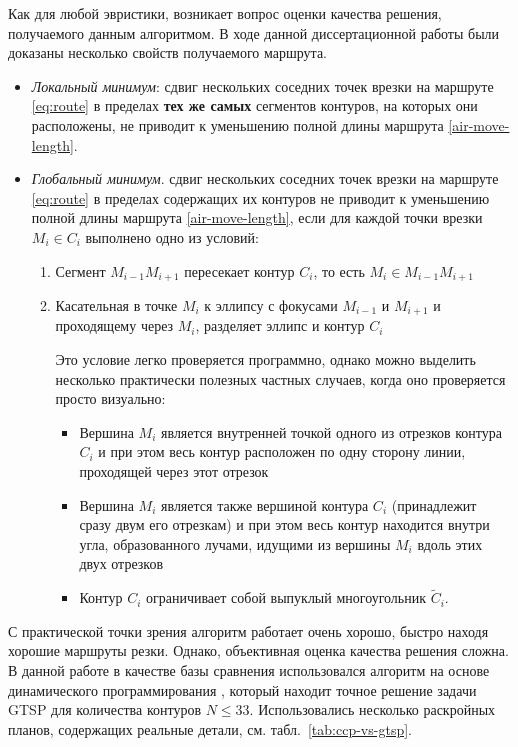 Как для любой эвристики,
возникает вопрос оценки качества решения,
получаемого данным алгоритмом.
В ходе данной диссертационной работы были доказаны несколько свойств получаемого маршрута.

\begin{itemize}
  \item
  {\it Локальный минимум}:
  сдвиг нескольких соседних точек врезки на маршруте \eqref{eq:route}
  в пределах {\bf тех же самых} сегментов контуров,
  на которых они расположены,
  не приводит к уменьшению полной длины маршрута \eqref{air-move-length}.
  \item
  {\it Глобальный минимум}.
  сдвиг нескольких соседних точек врезки на маршруте \eqref{eq:route}
  в пределах содержащих их контуров
  не приводит к уменьшению полной длины маршрута \eqref{air-move-length},
  если для каждой  точки врезки $M_i \in C_i$ выполнено одно из условий:
  \begin{enumerate}
    \item
    Сегмент
    $M_{i-1} M_{i+1}$
    пересекает контур
    $C_i$,
    то есть
    $M_i \in M_{i-1} M_{i+1}$
    \item
    Касательная в точке
    $M_i$
    к эллипсу с фокусами
    $M_{i-1}$
    и
    $M_{i+1}$
    и проходящему через
    $M_i$,
    разделяет эллипс и контур
    $C_i$

    Это условие легко проверяется программно,
    однако можно выделить несколько практически полезных частных случаев,
    когда оно проверяется просто визуально:
    \begin{itemize}
      \item
      Вершина
      $M_i$
      является внутренней точкой одного из
      отрезков контура
      $C_i$
      и при этом весь контур расположен
      по одну сторону линии,
      проходящей через этот отрезок
      \item
      Вершина
      $M_i$
      является также вершиной контура
      $C_i$
      (принадлежит сразу двум его отрезкам)
      и при этом весь контур находится
      внутри угла,
      образованного лучами,
      идущими из вершины
      $M_i$
      вдоль этих двух отрезков
      \item
      Контур
      $C_i$
      ограничивает собой выпуклый
      многоугольник
      $\widetilde C_i$.
    \end{itemize}
  \end{enumerate}
\end{itemize}

С практической точки зрения
алгоритм работает очень хорошо,
быстро находя хорошие маршруты резки.
Однако, объективная оценка качества решения сложна.
В данной работе в качестве базы сравнения использовался алгоритм
на основе динамического программирования
\autocite{bi:RoMa},
который находит точное решение задачи GTSP
для количества контуров
$N \leqslant 33$.
Использовались несколько раскройных планов,
содержащих реальные детали,
см. табл.~\ref{tab:ccp-vs-gtsp}.

